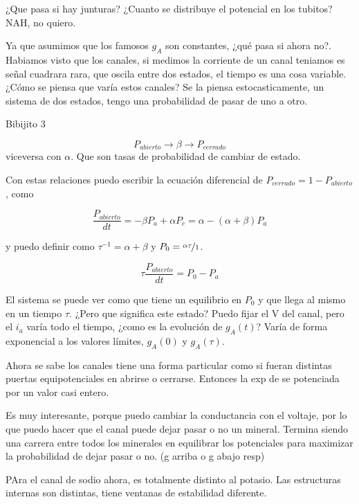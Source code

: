 ¿Que pasa si hay junturas? ¿Cuanto se distribuye el potencial en los tubitos? NAH, no quiero.

Ya que asumimos que los famosos $g_A$ son constantes, ¿qué pasa si ahora no?. Habiamos visto que los canales, si medimos la corriente de un canal teniamos es señal cuadrara rara, que oscila entre dos estados, el tiempo es una cosa variable. ¿Cómo se piensa que varía estos canales? Se la piensa estocasticamente, un sistema de dos estados, tengo una probabilidad de pasar de uno a otro.

Bibijito 3 

\begin{equation}
	P_{abierto} \rightarrow \beta \rightarrow P_{cerrado}
\end{equation}
viceversa con $\alpha$. Que son tasas de probabilidad de cambiar de estado. 

Con estas relaciones puedo escribir la ecuación diferencial de $P_{cerrado} = 1 -P_{abierto}$, como

\begin{equation}
	\frac{P_{abierto}}{dt} = -\beta P_a + \alpha P_c = \alpha - (\alpha + \beta)P_a
\end{equation}

y puedo definir como $\tau^{-1} = \alpha + \beta$ y $P_0=\nicefrac{\alpha\tau}{1}$.

\begin{equation}
 \tau \frac{P_{abierto}}{dt} = P_0 - P_a
 \end{equation}

 El sistema se puede ver como que tiene un equilibrio en $P_0$ y que llega al mismo en un tiempo $\tau$. ¿Pero que significa este estado?   Puedo fijar el V del canal, pero el $i_a$ varía todo el tiempo, ¿como es la evolución de $g_A(t)$? Varía de forma exponencial a los valores límites, $g_A(0)$ y $g_A(\tau)$.

Ahora se sabe los canales tiene una forma particular como si fueran distintas puertas equipotenciales en abrirse o cerrarse. Entonces la exp de se potenciada por un valor casi entero.

Es muy interesante, porque puedo cambiar la conductancia con el voltaje, por lo que puedo hacer que el canal puede dejar pasar o no un mineral. Termina siendo una carrera entre todos los minerales en equilibrar los potenciales para maximizar la probabilidad de dejar pasar o no. (g arriba o g abajo resp)

PAra el  canal de sodio ahora, es totalmente distinto al potasio. Las estructuras internas son distintas, tiene ventanas de estabilidad diferente. 

